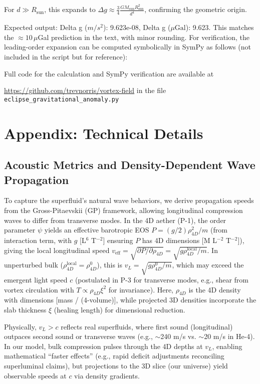 For \(d \gg R_\text{sun}\), this expands to \(\Delta g \approx \frac{3}{4} \frac{G M_\text{sun} R_\text{sun}^2}{d^4}\), confirming the geometric origin.

Expected output: Delta g ($m/s^2$): 9.623e-08, Delta g ($\mu\text{Gal}$): 9.623. This matches the \(\approx 10 \, \mu\)Gal prediction in the text, with minor rounding. For verification, the leading-order expansion can be computed symbolically in SymPy as follows (not included in the script but for reference):

Full code for the calculation and SymPy verification are available at

\noindent\url{https://github.com/trevnorris/vortex-field} in the file \verb|eclipse_gravitational_anomaly.py|


\section{Appendix: Technical Details}

\subsection{Acoustic Metrics and Density-Dependent Wave Propagation}

To capture the superfluid's natural wave behaviors, we derive propagation speeds from the Gross-Pitaevskii (GP) framework, allowing longitudinal compression waves to differ from transverse modes. In the 4D aether (P-1), the order parameter $\psi$ yields an effective barotropic EOS $P = (g / 2) \rho_{4D}^2 / m$ (from interaction term, with $g$ [L$^6$ T$^{-2}$] ensuring $P$ has 4D dimensions [M L$^{-2}$ T$^{-2}$]), giving the local longitudinal speed $v_{\text{eff}} = \sqrt{\partial P / \partial \rho_{4D}} = \sqrt{g \rho_{4D}^{\text{local}} / m}$. In unperturbed bulk ($\rho_{4D}^{\text{local}} = \rho_{4D}^0$), this is $v_L = \sqrt{g \rho_{4D}^0 / m}$, which may exceed the emergent light speed $c$ (postulated in P-3 for transverse modes, e.g., shear from vortex circulation with $T \propto \rho_{4D} \xi^2$ for invariance). Here, $\rho_{4D}$ is the 4D density with dimensions [mass / (4-volume)], while projected 3D densities incorporate the slab thickness $\xi$ (healing length) for dimensional reduction.

Physically, $v_L > c$ reflects real superfluids, where first sound (longitudinal) outpaces second sound or transverse waves (e.g., $\sim$240 m/s vs. $\sim$20 m/s in He-4). In our model, bulk compression pulses through the 4D depths at $v_L$, enabling mathematical ``faster effects'' (e.g., rapid deficit adjustments reconciling superluminal claims), but projections to the 3D slice (our universe) yield observable speeds at $c$ via density gradients.

